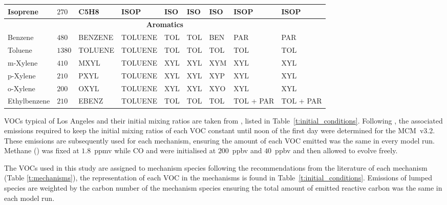 \begin{sidewaystable}
\begin{tabular}{lllllllll}
        Isoprene & $270$ & C5H8 & ISOP & ISO & ISO & ISO & ISOP & ISOP \\ \hline
        \multicolumn{9}{c}{\textbf{Aromatics}} \\ \hline 
        Benzene & $480$ & BENZENE & TOLUENE & TOL & TOL & BEN & PAR & PAR \\
        Toluene & $1380$ & TOLUENE & TOLUENE & TOL & TOL & TOL & TOL & TOL \\
        m-Xylene & $410$ & MXYL & TOLUENE & XYL & XYL & XYM & XYL & XYL \\
        p-Xylene & $210$ & PXYL & TOLUENE & XYL & XYL & XYP & XYL & XYL \\
        o-Xylene & $200$ & OXYL & TOLUENE & XYL & XYL & XYO & XYL & XYL \\
        Ethylbenzene & $210$ & EBENZ & TOLUENE & TOL & TOL & TOL & TOL + PAR & TOL + PAR \\ \hline \hline
    \end{tabular}
    \vspace{1mm}
    \caption{VOC present in Los Angeles, mixing ratios are taken from \citet{Baker:2008} and their representation in each chemical mechanism. The representation of the VOC in each mechanism is based upon the recommendations of the literature for each mechanism (Table \ref{t:mechanisms}).}
    \label{t:initial_conditions}
\end{sidewaystable}

VOCs typical of Los Angeles and their initial mixing ratios are taken from \citet{Baker:2008}, listed in \mbox{Table \ref{t:initial_conditions}}. 
Following \citet{Butler:2011}, the associated emissions required to keep the initial mixing ratios of each VOC constant until noon of the first day were determined for the \mbox{MCM v3.2.}
These emissions are subsequently used for each mechanism, ensuring the amount of each VOC emitted was the same in every model run.
Methane () was fixed at \mbox{$1.8$ ppmv} while CO and  were initialised at \mbox{$200$ ppbv} and \mbox{$40$ ppbv} and then allowed to evolve freely.

The VOCs used in this study are assigned to mechanism species following the recommendations from the literature of each mechanism (Table \ref{t:mechanisms}), the representation of each VOC in the mechanisms is found in \mbox{Table \ref{t:initial_conditions}}.
Emissions of lumped species are weighted by the carbon number of the mechanism species ensuring the total amount of emitted reactive carbon was the same in each model run.

